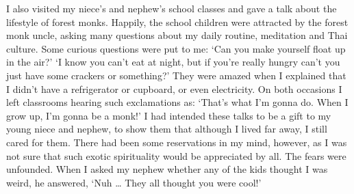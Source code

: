 I also visited my niece's and nephew's school classes and gave a talk
about the lifestyle of forest monks. Happily, the school children were
attracted by the forest monk uncle, asking many questions about my daily
routine, meditation and Thai culture. Some curious questions were put to
me: `Can you make yourself float up in the air?' `I know you can't eat
at night, but if you're really hungry can't you just have some crackers
or something?' They were amazed when I explained that I didn't have a
refrigerator or cupboard, or even electricity. On both occasions I left
classrooms hearing such exclamations as: `That's what I'm gonna do. When
I grow up, I'm gonna be a monk!' I had intended these talks to be a gift
to my young niece and nephew, to show them that although I lived far
away, I still cared for them. There had been some reservations in my
mind, however, as I was not sure that such exotic spirituality would be
appreciated by all. The fears were unfounded. When I asked my nephew
whether any of the kids thought I was weird, he answered, `Nuh \ldots{}
They all thought you were cool!'

